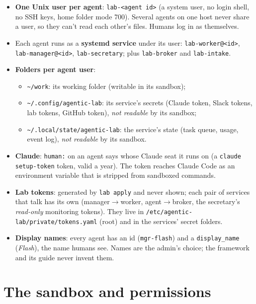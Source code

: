 \documentclass[11pt]{article}
\newcommand{\code}[1]{\texttt{#1}}
\begin{document}
\begin{itemize}
  \item \textbf{One Unix user per agent}: \code{lab-<agent id>} (a system user, no login
    shell, no SSH keys, home folder mode 700). Several agents on one host never share a
    user, so they can't read each other's files. Humans log in as themselves.
  \item Each agent runs as a \textbf{systemd service} under its user:
    \code{lab-worker@<id>}, \code{lab-manager@<id>}, \code{lab-secretary}; plus
    \code{lab-broker} and \code{lab-intake}.
  \item \textbf{Folders per agent user}:
    \begin{itemize}
      \item \code{\textasciitilde/work}: its working folder (writable in its sandbox);
      \item \code{\textasciitilde/.config/agentic-lab}: its service's secrets (Claude token,
        Slack tokens, lab tokens, GitHub token), \emph{not readable} by its sandbox;
      \item \code{\textasciitilde/.local/state/agentic-lab}: the service's state (task
        queue, usage, event log), \emph{not readable} by its sandbox.
    \end{itemize}
  \item \textbf{Claude}: \code{human:} on an agent says whose Claude seat it runs on (a
    \code{claude setup-token} token, valid a year). The token reaches Claude Code as an
    environment variable that is stripped from sandboxed commands.
  \item \textbf{Lab tokens}: generated by \code{lab apply} and never shown; each pair of
    services that talk has its own (manager$\to$worker, agent$\to$broker, the secretary's
    \emph{read-only} monitoring tokens). They live in
    \code{/etc/agentic-lab/private/tokens.yaml} (root) and in the services' secret folders.
  \item \textbf{Display names}: every agent has an id (\code{mgr-flash}) and a
    \code{display\_name} (\emph{Flash}), the name humans see. Names are the admin's choice;
    the framework and its guide never invent them.
\end{itemize}

\section{The sandbox and permissions}
\end{document}
